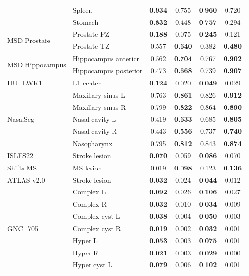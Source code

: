 \begin{longtable}{@{}llcccc@{}}
   & Spleen & \textbf{0.934} & 0.755 & \textbf{0.960} & 0.720 \\
   & Stomach & \textbf{0.832} & 0.448 & \textbf{0.757} & 0.294 \\
  \midrule
  \multirow{2}{*}{MSD Prostate} & Prostate PZ & \textbf{0.188} & 0.075 & \textbf{0.245} & 0.121 \\
   & Prostate TZ & 0.557 & \textbf{0.640} & 0.382 & \textbf{0.480} \\
  \midrule
  \multirow{2}{*}{MSD Hippocampus} & Hippocampus anterior & 0.562 & \textbf{0.704} & 0.767 & \textbf{0.902} \\
   & Hippocampus posterior & 0.473 & \textbf{0.668} & 0.739 & \textbf{0.907} \\
  \midrule
  HU\_LWK1 & L1 center & \textbf{0.124} & 0.020 & \textbf{0.049} & 0.029 \\
  \midrule
  \multirow{5}{*}{NasalSeg} & Maxillary sinus L & 0.763 & \textbf{0.861} & 0.826 & \textbf{0.912} \\
   & Maxillary sinus R & 0.799 & \textbf{0.822} & 0.864 & \textbf{0.890} \\
   & Nasal cavity L & 0.419 & \textbf{0.633} & 0.685 & \textbf{0.805} \\
   & Nasal cavity R & 0.443 & \textbf{0.556} & 0.737 & \textbf{0.740} \\
   & Nasopharynx & 0.795 & \textbf{0.812} & 0.843 & \textbf{0.874} \\
  \midrule
  ISLES22 & Stroke lesion & \textbf{0.070} & 0.059 & \textbf{0.086} & 0.070 \\
  \midrule
  Shifts-MS & MS lesion & 0.019 & \textbf{0.098} & 0.123 & \textbf{0.136} \\
  \midrule
  ATLAS v2.0 & Stroke lesion & \textbf{0.032} & 0.024 & \textbf{0.044} & 0.012 \\
  \midrule
  \multirow{13}{*}{GNC\_705} & Complex L & \textbf{0.092} & 0.026 & \textbf{0.106} & 0.027 \\
   & Complex R & \textbf{0.032} & 0.010 & \textbf{0.034} & 0.009 \\
   & Complex cyst L & \textbf{0.038} & 0.004 & \textbf{0.050} & 0.003 \\
   & Complex cyst R & \textbf{0.019} & 0.002 & \textbf{0.032} & 0.001 \\
   & Hyper L & \textbf{0.053} & 0.003 & \textbf{0.075} & 0.001 \\
   & Hyper R & \textbf{0.021} & 0.003 & \textbf{0.029} & 0.000 \\
   & Hyper cyst L & \textbf{0.079} & 0.006 & \textbf{0.102} & 0.001 \\

\end{longtable}
